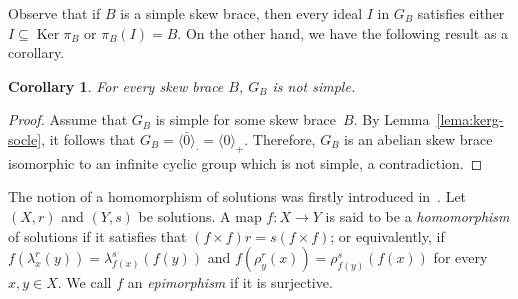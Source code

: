 \documentclass[12pt, a4paper, english]{article}
\newtheorem{corolari}[teorema]{Corollary}
\theoremstyle{definition}
\theoremstyle{remark}
\DeclareMathOperator{\Ker}{Ker}
\newcommand{\bigcdot}{\boldsymbol{\cdot}}
\begin{document}
Observe that if $B$ is a simple skew brace, then every ideal $I$ in $G_B$ satisfies either $I \subseteq \Ker \pi_B$ or $\pi_B(I) = B$. On the other hand, we have the following result as a corollary.

\begin{corolari}
\label{cor:G_B-maiSimple}
For every skew brace $B$, $G_B$ is not simple.
\end{corolari}

\begin{proof}
Assume that $G_B$ is simple for some skew brace~$B$. By Lemma~\ref{lema:kerg-socle}, it follows that $G_B = \langle \bar 0 \rangle_{\bigcdot} = \langle 0 \rangle_+$. Therefore, $G_B$ is an abelian skew brace isomorphic to an infinite cyclic group which is not simple, a contradiction.
\end{proof}




%
%



\bigskip

The notion of a homomorphism of solutions was firstly introduced in~\cite{Gateva-IvanovaMajid07}. Let $(X,r)$ and $(Y,s)$ be solutions. A map $f\colon X \rightarrow Y$ is said to be a \emph{homomorphism} of solutions if it satisfies that $(f\times f) r = s (f \times f)$; or equivalently, if $f(\lambda^r_x(y)) = \lambda^s_{f(x)}(f(y))$ and $f(\rho^r_y(x)) = \rho^s_{f(y)}(f(x))$ for every $x,y\in X$. We call $f$ an \emph{epimorphism} if it is surjective.
\end{document}
